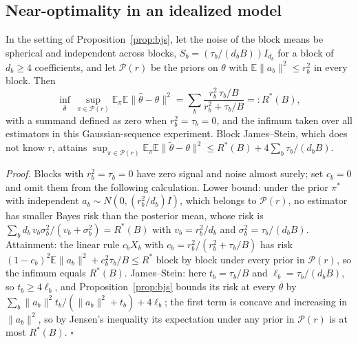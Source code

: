 \subsection*{Near-optimality in an idealized model}
\begin{proposition}\label{prop:minimax}
In the setting of Proposition~\ref{prop:bjs}, let the noise of the block means be spherical and independent across blocks, $S_b=(\tau_b/(d_bB))I_{d_b}$ for a block of $d_b\ge4$ coefficients, and let $\mathcal{P}(r)$ be the priors on $\theta$ with $\mathbb{E}\|a_b\|^2\le r_b^2$ in every block. Then
\[
\inf_{\hat\theta}\,\sup_{\pi\in\mathcal{P}(r)}\mathbb{E}_\pi\mathbb{E}\|\hat\theta-\theta\|^2=\sum_b\frac{r_b^2\,\tau_b/B}{r_b^2+\tau_b/B}=:R^*(B),
\]
with a summand defined as zero when $r_b^2=\tau_b=0$, and the infimum taken over all estimators in this Gaussian-sequence experiment. Block James--Stein, which does not know $r$, attains $\sup_{\pi\in\mathcal{P}(r)}\mathbb{E}_\pi\mathbb{E}\|\tilde\theta-\theta\|^2\le R^*(B)+4\sum_b\tau_b/(d_bB)$.
\end{proposition}
\noindent\textit{Proof.} Blocks with $r_b^2=\tau_b=0$ have zero signal and noise almost surely; set $c_b=0$ and omit them from the following calculation. Lower bound: under the prior $\pi^*$ with independent $a_b\sim N(0,(r_b^2/d_b)I)$, which belongs to $\mathcal{P}(r)$, no estimator has smaller Bayes risk than the posterior mean, whose risk is $\sum_bd_b\,v_b\sigma_b^2/(v_b+\sigma_b^2)=R^*(B)$ with $v_b=r_b^2/d_b$ and $\sigma_b^2=\tau_b/(d_bB)$. Attainment: the linear rule $c_bX_b$ with $c_b=r_b^2/(r_b^2+\tau_b/B)$ has risk $(1-c_b)^2\mathbb{E}\|a_b\|^2+c_b^2\tau_b/B\le R^*$ block by block under every prior in $\mathcal{P}(r)$, so the infimum equals $R^*(B)$. James--Stein: here $t_b=\tau_b/B$ and $\ell_b=\tau_b/(d_bB)$, so $t_b\ge4\ell_b$, and Proposition~\ref{prop:bjs} bounds its risk at every $\theta$ by $\sum_b\|a_b\|^2t_b/(\|a_b\|^2+t_b)+4\ell_b$; the first term is concave and increasing in $\|a_b\|^2$, so by Jensen's inequality its expectation under any prior in $\mathcal{P}(r)$ is at most $R^*(B)$. $\square$

